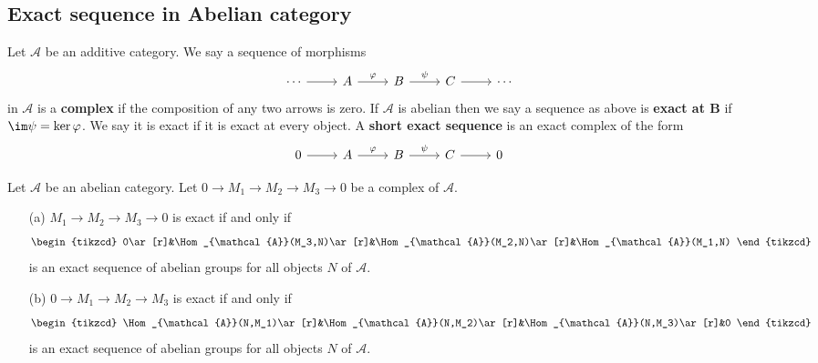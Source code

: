 \subsection{Exact sequence in Abelian category}
\begin{definition}
Let $\mathcal{A}$ be an additive category. We say a sequence of morphisms
\[\begin{tikzcd}
\cdots\ar[r]&A\ar[r,"\varphi"]&B\ar[r,"\psi"]&C\ar[r]&\cdots
\end{tikzcd}\]
in $\mathcal{A}$ is a \textbf{complex} if the composition of any two arrows is zero. If $\mathcal{A}$ is abelian then we say a sequence as above is \textbf{exact at $\bm{B}$} if $\im\psi=\ker\varphi$. We say it is exact if it is exact at every object. A \textbf{short exact sequence} is an exact complex of the form
\[\begin{tikzcd}
0\ar[r]&A\ar[r,"\varphi"]&B\ar[r,"\psi"]&C\ar[r]&0
\end{tikzcd}\]
\end{definition}
\begin{proposition}
Let $\mathcal{A}$ be an abelian category. Let $0\to M_1\to M_2\to M_3\to0$ be a complex of $\mathcal{A}$.
\begin{enumerate}
\item[(a)] $M_1\to M_2\to M_3\to 0$ is exact if and only if
\[\begin{tikzcd}
0\ar[r]&\Hom_{\mathcal{A}}(M_3,N)\ar[r]&\Hom_{\mathcal{A}}(M_2,N)\ar[r]&\Hom_{\mathcal{A}}(M_1,N)
\end{tikzcd}\]
is an exact sequence of abelian groups for all objects $N$ of $\mathcal{A}$.
\item[(b)] $0\to M_1\to M_2\to M_3$ is exact if and only if
\[\begin{tikzcd}
\Hom_{\mathcal{A}}(N,M_1)\ar[r]&\Hom_{\mathcal{A}}(N,M_2)\ar[r]&\Hom_{\mathcal{A}}(N,M_3)\ar[r]&0
\end{tikzcd}\]
is an exact sequence of abelian groups for all objects $N$ of $\mathcal{A}$.
\end{enumerate}
\end{proposition}
